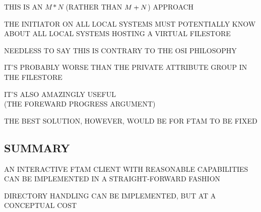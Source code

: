 \begin{bwslide}

\begin{nrtc}
\item	THIS IS AN $M*N$ (RATHER THAN $M+N\/$) APPROACH
    \begin{nrtc}
    \item	THE INITIATOR ON ALL LOCAL SYSTEMS MUST POTENTIALLY KNOW ABOUT
		ALL LOCAL SYSTEMS HOSTING A VIRTUAL FILESTORE
    \end{nrtc}

\item	NEEDLESS TO SAY THIS IS CONTRARY TO THE OSI PHILOSOPHY
    \begin{nrtc}
    \item	IT'S PROBABLY WORSE THAN THE PRIVATE ATTRIBUTE GROUP IN
		THE FILESTORE
    \end{nrtc}

\item	IT'S ALSO AMAZINGLY USEFUL\\ (THE FOREWARD PROGRESS ARGUMENT)

\item	THE BEST SOLUTION, HOWEVER, WOULD BE FOR FTAM TO BE FIXED
\end{nrtc}
\end{bwslide}


\begin{bwslide}
\part*	{SUMMARY}\bf

\begin{nrtc}
\item	AN INTERACTIVE FTAM CLIENT WITH REASONABLE CAPABILITIES CAN BE
	IMPLEMENTED IN A STRAIGHT-FORWARD FASHION

\item	DIRECTORY HANDLING CAN BE IMPLEMENTED, BUT AT A CONCEPTUAL COST
\end{nrtc}
\end{bwslide}

